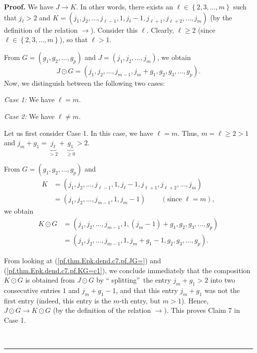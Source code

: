 \documentclass[numbers=enddot,12pt,final,onecolumn,notitlepage]{scrartcl}%
\theoremstyle{definition}
\newenvironment{proof}[1][Proof]{\noindent\textbf{#1.} }{\ \rule{0.5em}{0.5em}}
\begin{document}
\begin{proof}
We have $J\rightarrow K$. In other words, there exists an $\ell\in\left\{
2,3,\ldots,m\right\}  $ such that $j_{\ell}>2$ and $K=\left(  j_{1}%
,j_{2},\ldots,j_{\ell-1},1,j_{\ell}-1,j_{\ell+1},j_{\ell+2},\ldots
,j_{m}\right)  $ (by the definition of the relation $\rightarrow$). Consider
this $\ell$. Clearly, $\ell\geq2$ (since $\ell\in\left\{  2,3,\ldots
,m\right\}  $), so that $\ell>1$.

From $G=\left(  g_{1},g_{2},\ldots,g_{p}\right)  $ and $J=\left(  j_{1}%
,j_{2},\ldots,j_{m}\right)  $, we obtain%
\begin{equation}
J\odot G=\left(  j_{1},j_{2},\ldots,j_{m-1},j_{m}+g_{1},g_{2},g_{3}%
,\ldots,g_{p}\right)  . \label{pf.thm.Epk.dend.c7.pf.JG=}%
\end{equation}
Now, we distinguish between the following two cases:

\textit{Case 1:} We have $\ell=m$.

\textit{Case 2:} We have $\ell\neq m$.

Let us first consider Case 1. In this case, we have $\ell=m$. Thus,
$m=\ell\geq2>1$ and $j_{m}+g_{1}=\underbrace{j_{\ell}}_{>2}+\underbrace{g_{1}%
}_{\geq0}>2$.

From $G=\left(  g_{1},g_{2},\ldots,g_{p}\right)  $ and
\begin{align*}
K  &  =\left(  j_{1},j_{2},\ldots,j_{\ell-1},1,j_{\ell}-1,j_{\ell+1}%
,j_{\ell+2},\ldots,j_{m}\right) \\
&  =\left(  j_{1},j_{2},\ldots,j_{m-1},1,j_{m}-1\right)
\ \ \ \ \ \ \ \ \ \ \left(  \text{since }\ell=m\right)  ,
\end{align*}
we obtain%
\begin{align}
K\odot G  &  =\left(  j_{1},j_{2},\ldots,j_{m-1},1,\left(  j_{m}-1\right)
+g_{1},g_{2},g_{3},\ldots,g_{p}\right) \nonumber\\
&  =\left(  j_{1},j_{2},\ldots,j_{m-1},1,j_{m}+g_{1}-1,g_{2},g_{3}%
,\ldots,g_{p}\right)  . \label{pf.thm.Epk.dend.c7.pf.KG=c1}%
\end{align}


From looking at (\ref{pf.thm.Epk.dend.c7.pf.JG=}) and
(\ref{pf.thm.Epk.dend.c7.pf.KG=c1}), we conclude immediately that the
composition $K\odot G$ is obtained from $J\odot G$ by \textquotedblleft
splitting\textquotedblright\ the entry $j_{m}+g_{1}>2$ into two consecutive
entries $1$ and $j_{m}+g_{1}-1$, and that this entry $j_{m}+g_{1}$ was not the
first entry (indeed, this entry is the $m$-th entry, but $m>1$). Hence,
$J\odot G\rightarrow K\odot G$ (by the definition of the relation
$\rightarrow$). This proves Claim 7 in Case 1.


\end{proof}
\end{document}
